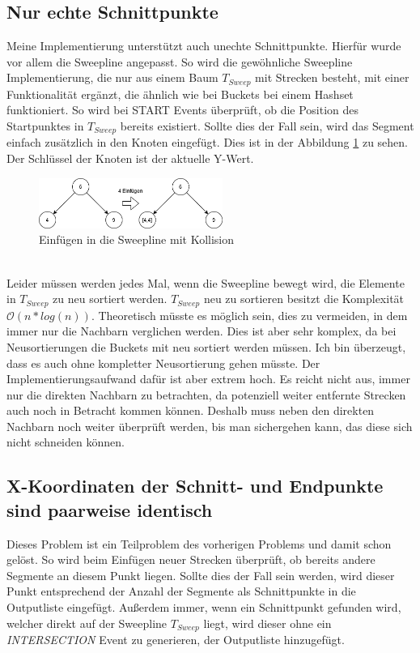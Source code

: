 \documentclass[conference]{IEEEtran}
\begin{document}
	\subsection{Nur echte Schnittpunkte}
	Meine Implementierung unterstützt auch unechte Schnittpunkte. Hierfür wurde vor allem die Sweepline angepasst. So wird die gewöhnliche Sweepline Implementierung, die nur aus einem Baum $T_{Sweep}$ mit Strecken besteht, mit einer Funktionalität ergänzt, die ähnlich wie bei Buckets bei einem Hashset funktioniert. So wird bei START Events überprüft, ob die Position des Startpunktes in $T_{Sweep}$ bereits existiert. Sollte dies der Fall sein, wird das Segment einfach zusätzlich in den Knoten eingefügt. Dies ist in der Abbildung \ref{figure_collision} zu sehen. Der Schlüssel der Knoten ist der aktuelle Y-Wert.\\
	\begin{figure}[h!]
		\begin{center}
			\includegraphics[width=6cm]{BaumKollision.png}
			\caption{Einfügen in die Sweepline mit Kollision}
			\label{figure_collision}
		\end{center}
	\end{figure}\\
	Leider müssen werden jedes Mal, wenn die Sweepline bewegt wird, die Elemente in $T_{Sweep}$ zu neu sortiert werden. $T_{Sweep}$ neu zu sortieren besitzt die Komplexität $\mathcal{O}(n*log(n))$. Theoretisch müsste es möglich sein, dies zu vermeiden, in dem immer nur die Nachbarn verglichen werden. Dies ist aber sehr komplex, da bei Neusortierungen die Buckets mit neu sortiert werden müssen. Ich bin überzeugt, dass es auch ohne kompletter Neusortierung gehen müsste. Der Implementierungsaufwand dafür ist aber extrem hoch. Es reicht nicht aus, immer nur die direkten Nachbarn zu betrachten, da potenziell weiter entfernte Strecken auch noch in Betracht kommen können. Deshalb muss neben den direkten Nachbarn noch weiter überprüft werden, bis man sichergehen kann, das diese sich nicht schneiden können.
	
	\subsection{X-Koordinaten der Schnitt- und Endpunkte sind paarweise identisch}
	Dieses Problem ist ein Teilproblem des vorherigen Problems und damit schon gelöst.
	So wird beim Einfügen neuer Strecken überprüft, ob bereits andere Segmente an diesem Punkt liegen. Sollte dies der Fall sein werden, wird dieser Punkt entsprechend der Anzahl der Segmente als Schnittpunkte in die Outputliste eingefügt. Außerdem immer, wenn ein Schnittpunkt gefunden wird, welcher direkt auf der Sweepline $T_{Sweep}$ liegt, wird dieser ohne ein \textit{INTERSECTION} Event zu generieren, der Outputliste hinzugefügt.
	
\end{document}
